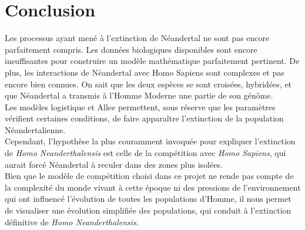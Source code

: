 \documentclass[a4paper,11pt]{article}
\begin{document}
\section{Conclusion}

Les processus ayant mené à l'extinction de Néandertal ne sont pas encore parfaitement compris. Les données biologiques disponibles sont encore insuffisantes pour construire un modèle mathématique parfaitement pertinent.
De plus, les interactions de Néandertal avec Homo Sapiens sont complexes et pas encore bien connues. On sait que les deux espèces se sont croisées, hybridées, et que Néandertal a transmis à l'Homme Moderne une partie de son génôme.\\
Les modèles logistique et Allee permettent, sous réserve que les paramètres vérifient certaines conditions, de faire apparaître l'extinction de la population Néandertalienne. \\
Cependant, l'hypothèse la plus couramment invoquée pour expliquer l'extinction de \textit{Homo Neanderthalensis} est celle de la compétition avec \textit{Homo Sapiens}, qui aurait forcé Néandertal à reculer dans des zones plus isolées.\\
Bien que le modèle de compétition choisi dans ce projet ne rende pas compte de la complexité du monde vivant à cette époque ni des pressions de l'environnement qui ont influencé l'évolution de toutes les populations d'Homme, il nous permet de visualiser une évolution simplifiée des populations, qui conduit à l'extinction définitive de \textit{Homo Neanderthalensis}.
\end{document}
